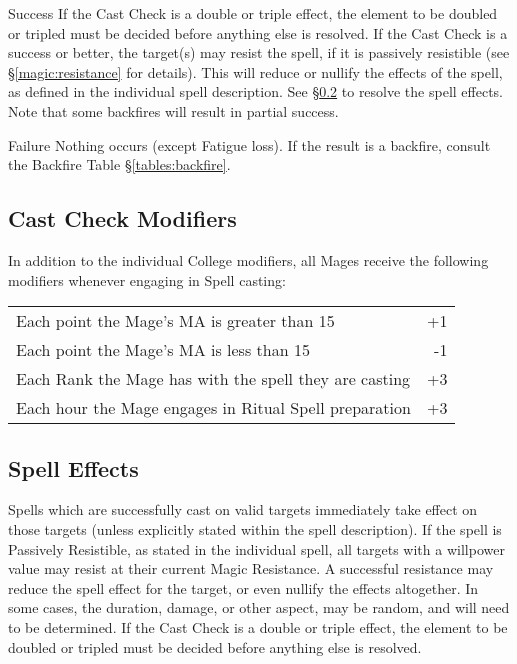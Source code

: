 \begin{multicols*}{3}
\begin{Description}
\item[Success]
If the Cast Check is a double or triple effect, the element to be
doubled or tripled must be decided before anything else is
resolved. If the Cast Check is a success or better, the target(s) may
resist the spell, if it is passively resistible (see
\S\ref{magic:resistance} for details). This will reduce or nullify the
effects of the spell, as defined in the individual spell
description. See \S\ref{magic:effects} to resolve the spell
effects. Note that some backfires will result in partial success.

\item[Failure]
Nothing occurs (except Fatigue loss). If the result is a backfire,
consult the Backfire Table \S\ref{tables:backfire}.

\end{Description}

\subsection{Cast Check Modifiers}
\label{magic:modifiers}

In addition to the individual College modifiers, all Mages receive the
following modifiers whenever engaging in Spell casting:

{\small \begin{tabularx}{\linewidth}{Xr}
Each point the Mage's MA is greater than 15 & +1 \\
Each point the Mage's MA is less than 15 & -1 \\
Each Rank the Mage has with the spell they are casting & +3 \\
Each hour the Mage engages in Ritual Spell preparation & +3 \\
\end{tabularx}}

\subsection{Spell Effects}
\label{magic:effects}

Spells which are successfully cast on valid targets immediately take
effect on those targets (unless explicitly stated within the spell
description). If the spell is Passively Resistible, as stated in the
individual spell, all targets with a willpower value may resist at
their current Magic Resistance. A successful resistance may reduce the
spell effect for the target, or even nullify the effects altogether.
In some cases, the duration, damage, or other aspect, may be random,
and will need to be determined. If the Cast Check is a double or
triple effect, the element to be doubled or tripled must be decided
before anything else is resolved.


\end{multicols*}
